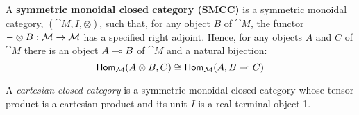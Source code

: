 \begin{definition}
\begin{itemize}
  \end{itemize}
\end{definition}


\begin{definition}
  \label{def:SMCC}
  A \textbf{symmetric monoidal closed category (SMCC)} is a symmetric
  monoidal category, $(\cat{M},I,\otimes)$, such that, for any object
  $B$ of $\cat{M}$, the functor $- \otimes B : \mathcal{M} \rightarrow \mathcal{M}$
  has a specified right adjoint.  Hence, for any objects $A$ and $C$
  of $\cat{M}$ there is an object $A \multimap B$ of $\cat{M}$ and a
  natural bijection:
  \[
  \mathsf{Hom}_{\mathcal{M}}(A \otimes B,C) \cong \mathsf{Hom}_{\mathcal{M}}(A,B \multimap C)
  \]
\end{definition}

A \textit{cartesian closed category} is a symmetric monoidal closed category whose tensor product is a cartesian product and its unit $I$ is a real terminal object 1.

